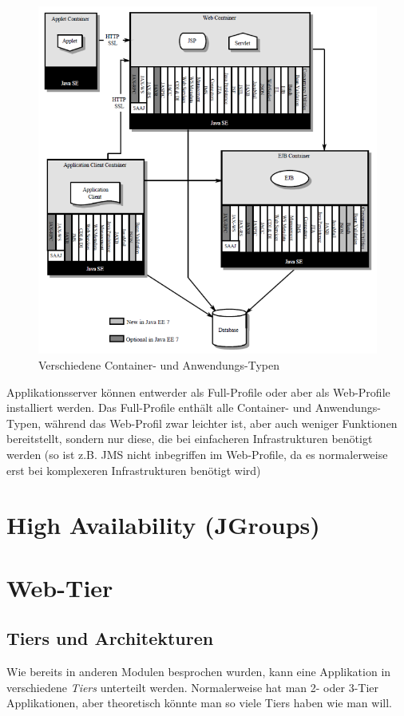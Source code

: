 \documentclass[a4paper, 11pt]{article}
\begin{document}
\begin{figure}[htb]
    \centering
    \includegraphics[keepaspectratio=true,height=20\baselineskip]{container_types.png}
    \caption{Verschiedene Container- und Anwendungs-Typen}
    \label{fig:container_types}
\end{figure}

Applikationsserver können entwerder als Full-Profile oder aber als Web-Profile installiert werden. Das Full-Profile enthält alle Container- und Anwendungs-Typen, während das Web-Profil zwar leichter ist, aber auch weniger Funktionen bereitstellt, sondern nur diese, die bei einfacheren Infrastrukturen benötigt werden (so ist z.B. JMS nicht inbegriffen im Web-Profile, da es normalerweise erst bei komplexeren Infrastrukturen benötigt wird)


\section{High Availability (JGroups)}

\section{Web-Tier}
\subsection{Tiers und Architekturen}
Wie bereits in anderen Modulen besprochen wurden, kann eine Applikation in verschiedene \textit{Tiers} unterteilt werden. Normalerweise hat man 2- oder 3-Tier Applikationen, aber theoretisch könnte man so viele Tiers haben wie man will.
\end{document}
